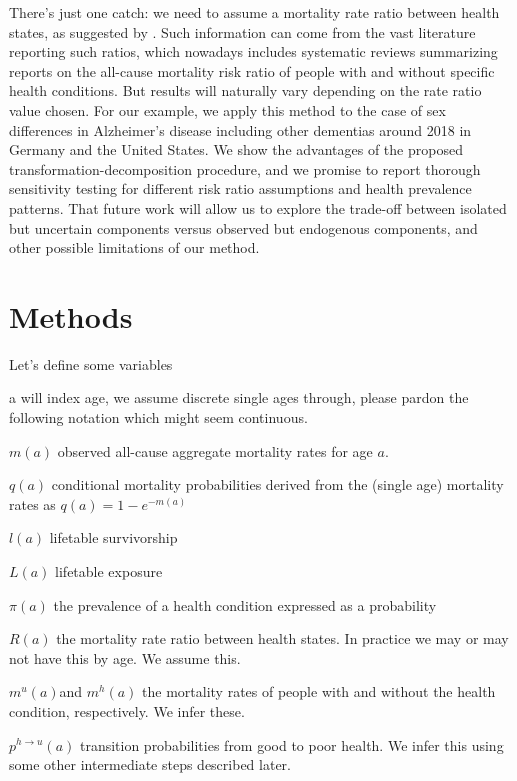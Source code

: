 \documentclass[sn-apa]{sn-jnl}%
\theoremstyle{thmstyleone}%
\theoremstyle{thmstyletwo}%
\theoremstyle{thmstylethree}%
\begin{document}
There's just one catch: we need to assume a mortality rate ratio between health states, as suggested by \citet{brinks2013deriving}. Such information can come from the vast literature reporting such ratios, which nowadays includes systematic reviews summarizing reports on the all-cause mortality risk ratio of people with and without specific health conditions. But results will naturally vary depending on the rate ratio value chosen. For our example, we apply this method to the case of sex differences in Alzheimer's disease including other dementias around 2018 in Germany and the United States. We show the advantages of the proposed transformation-decomposition procedure, and we promise to report thorough sensitivity testing for different risk ratio assumptions and health prevalence patterns. That future work will allow us to explore the trade-off between isolated but uncertain components versus observed but endogenous components, and other possible limitations of our method.

\section{Methods}\label{sec2}

Let's define some variables
\begin{description}
 \item{a} will index age, we assume discrete single ages through, please pardon the following notation which might seem continuous.
 \item{$m(a)$} observed all-cause aggregate mortality rates for age $a$. 
 \item{$q(a)$} conditional mortality probabilities derived from the (single age) mortality rates as $q(a) = 1 - e^{-m(a)}$
 \item{$l(a)$} lifetable survivorship
 \item{$L(a)$} lifetable exposure
 \item{$\pi(a)$} the prevalence of a health condition expressed as a probability
 \item{$R(a)$} the mortality rate ratio between health states. In practice we may or may not have this by age. We assume this.
 \item{$m^u(a)$and $m^h(a)$} the mortality rates of people with and without the health condition, respectively. We infer these.
 \item{$p^{h\rightarrow u}(a)$} transition probabilities from good to poor health. We infer this using some other intermediate steps described later.
\end{description}
\end{document}
